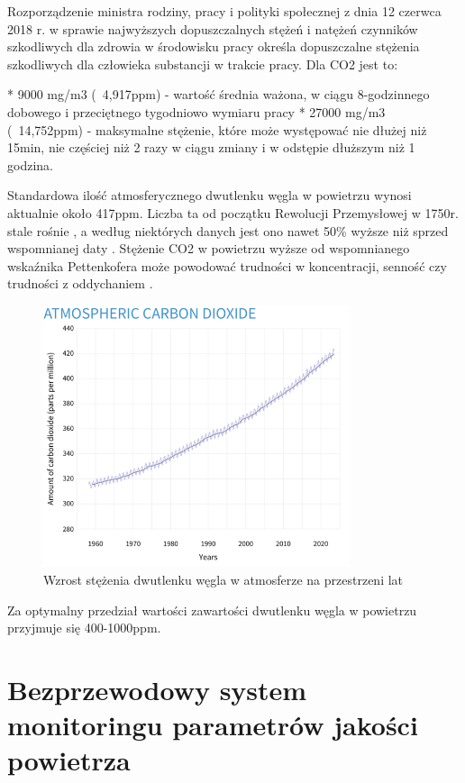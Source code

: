 \documentclass[a4paper, 12pt]{article}
\begin{document}
Rozporządzenie ministra rodziny, pracy i polityki społecznej z dnia 12 czerwca 2018 r. w sprawie 
najwyższych dopuszczalnych stężeń i natężeń czynników szkodliwych dla zdrowia w środowisku \cite{min-stezenia} pracy określa 
dopuszczalne stężenia szkodliwych dla człowieka substancji w trakcie pracy. Dla CO2 jest to:

* 9000 mg/m3 (~4,917ppm) - wartość średnia ważona, w ciągu 8-godzinnego dobowego i przeciętnego tygodniowo wymiaru pracy
* 27000 mg/m3 (~14,752ppm) - maksymalne stężenie, które może występować nie dłużej niż 15min, nie częściej niż 2 razy w ciągu zmiany i w odstępie dłuższym niż 1 godzina.

Standardowa ilość atmosferycznego dwutlenku węgla w powietrzu wynosi aktualnie około 417ppm. 
Liczba ta od początku Rewolucji Przemysłowej w 1750r. stale rośnie \cite{atmo-co2-change}, a według niektórych danych jest 
ono nawet 50\% wyższe niż sprzed wspomnianej daty \cite{50-percent}. Stężenie CO2 w powietrzu wyższe od 
wspomnianego wskaźnika Pettenkofera może powodować trudności w koncentracji, senność czy 
trudności z oddychaniem \cite{pettenhofer}.

\begin{figure}[H]
    \centering
    \includegraphics[width=0.8\textwidth]{zdj/more-co2.png}
    \caption{Wzrost stężenia dwutlenku węgla w atmosferze na przestrzeni lat}
\end{figure}

Za optymalny przedział wartości zawartości dwutlenku węgla w powietrzu przyjmuje się 400-1000ppm.

\section{Bezprzewodowy system monitoringu parametrów jakości powietrza}
\end{document}
